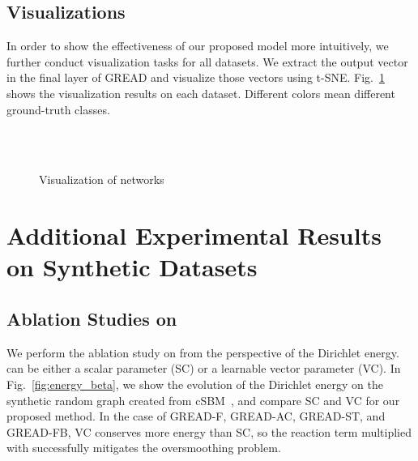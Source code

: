 \documentclass{article}
\theoremstyle{plain}
\theoremstyle{definition}
\theoremstyle{remark}
\begin{document}
\subsection{Visualizations}\label{a:visualization}
In order to show the effectiveness of our proposed model more intuitively, we further conduct visualization tasks for all datasets. We extract the output vector in the final layer of GREAD and visualize those vectors using t-SNE. Fig.~\ref{fig:networks} shows the visualization results on each dataset. Different colors mean different ground-truth classes.
 \begin{figure}[ht!]
    \centering
    \\
    \\
    \caption{Visualization of networks}
    \label{fig:networks}
 \end{figure}

\clearpage

\section{Additional Experimental Results on Synthetic Datasets}
\subsection{Ablation Studies on }
We perform the ablation study on  from the perspective of the Dirichlet energy.  can be either a scalar parameter (SC) or a learnable vector parameter (VC). In Fig.~\ref{fig:energy_beta}, we show the evolution of the Dirichlet energy on the synthetic random graph created from cSBM~\cite{Deshpande2018cSBM}, and compare SC and VC for our proposed method. In the case of GREAD-F, GREAD-AC, GREAD-ST, and GREAD-FB, VC conserves more energy than SC, so the reaction term multiplied with  successfully mitigates the oversmoothing problem.
\end{document}
